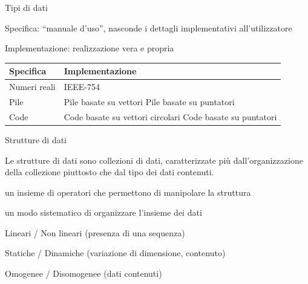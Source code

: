 \begin{frame}{Tipi di dati}
  
\begin{myboxtitle}
\BI
\item \alert{Specifica}: “manuale d'uso”, nasconde i dettagli implementativi all'utilizzatore
\item \alert{Implementazione}: realizzazione vera e propria
\EI
\end{myboxtitle}

\begin{myboxtitle}[Esempi]
\begin{center}
\begin{tabular}{|P{3cm}|P{7cm}|}
\hline
\textbf{Specifica} & \textbf{Implementazione} \\
\hline
Numeri reali & IEEE-754 \\
\hline
Pile & Pile basate su vettori \newline Pile basate su puntatori \\
\hline
Code & Code basate su vettori circolari \newline Code basate su puntatori \\
\hline
\end{tabular}
\end{center}
\end{myboxtitle}
  
\end{frame}

\begin{frame}{Strutture di dati}

\vspace{-6pt}
\begin{myboxtitle}
Le strutture di dati sono collezioni di dati, caratterizzate più
dall'organizzazione della collezione piuttosto che dal tipo dei dati contenuti.
\end{myboxtitle}

\begin{myboxtitle}
\BI
\item un insieme di operatori che permettono di manipolare la struttura 
\item un modo sistematico di organizzare l'insieme dei dati
\EI
\end{myboxtitle}

\begin{myboxtitle}
\BI
\item \alert{Lineari} / \alert{Non lineari} (presenza di una sequenza)
\item \alert{Statiche} / \alert{Dinamiche} (variazione di dimensione, contenuto)
\item \alert{Omogenee} / \alert{Disomogenee} (dati contenuti) 
\EI
\end{myboxtitle}

\end{frame}

